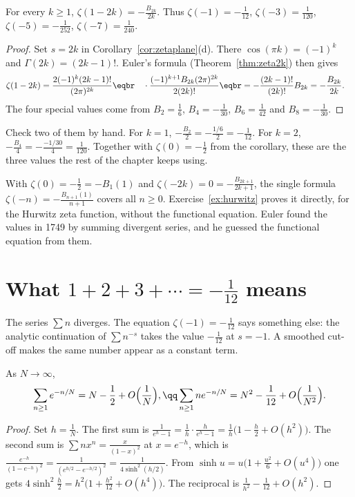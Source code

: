 \begin{theorem}\label{thm:zetaneg}
For every $k\ge1$, $\displaystyle\zeta(1-2k)=-\frac{B_{2k}}{2k}$. Thus $\zeta(-1)=-\frac1{12}$, $\zeta(-3)=\frac1{120}$, $\zeta(-5)=-\frac1{252}$, $\zeta(-7)=\frac1{240}$.
\end{theorem}
\begin{proof}
Set $s=2k$ in Corollary~\ref{cor:zetaplane}(d). There $\cos(\pi k)=(-1)^k$ and $\Gamma(2k)=(2k-1)!$. Euler's formula (Theorem~\ref{thm:zeta2k}) then gives
\[
\begin{aligned}\zeta(1-2k)&=\frac{2(-1)^k(2k-1)!}{(2\pi)^{2k}}\eqbr\quad\cdot\frac{(-1)^{k+1}B_{2k}(2\pi)^{2k}}{2(2k)!}\eqbr=-\frac{(2k-1)!}{(2k)!}B_{2k}=-\frac{B_{2k}}{2k}.\end{aligned}
\]
The four special values come from $B_2=\frac16$, $B_4=-\frac1{30}$, $B_6=\frac1{42}$ and $B_8=-\frac1{30}$.
\end{proof}

Check two of them by hand. For $k=1$, $-\frac{B_2}{2}=-\frac{1/6}{2}=-\frac1{12}$. For $k=2$, $-\frac{B_4}{4}=-\frac{-1/30}{4}=\frac1{120}$. Together with $\zeta(0)=-\frac12$ from the corollary, these are the three values the rest of the chapter keeps using.

With $\zeta(0)=-\frac12=-B_1(1)$ and $\zeta(-2k)=0=-\frac{B_{2k+1}}{2k+1}$, the single formula $\zeta(-n)=-\frac{B_{n+1}(1)}{n+1}$ covers all $n\ge0$. Exercise~\ref{ex:hurwitz} proves it directly, for the Hurwitz zeta function, without the functional equation. Euler found the values in 1749 by summing divergent series, and he guessed the functional equation from them.

\section{What $1+2+3+\cdots=-\frac1{12}$ means}

The series $\sum n$ diverges. The equation $\zeta(-1)=-\frac1{12}$ says something else: the analytic continuation of $\sum n^{-s}$ takes the value $-\frac1{12}$ at $s=-1$. A smoothed cut-off makes the same number appear as a constant term.

\begin{proposition}\label{prop:smoothed}
As $N\to\infty$,
\[
\begin{gathered}\sum_{n\ge1}e^{-n/N}=N-\frac12+O\Bigl(\frac1N\Bigr),\qq\sum_{n\ge1}ne^{-n/N}=N^2-\frac1{12}+O\Bigl(\frac1{N^2}\Bigr).\end{gathered}
\]
\end{proposition}
\begin{proof}
Set $h=\frac1N$. The first sum is $\frac1{e^h-1}=\frac1h\cdot\frac h{e^h-1}=\frac1h\bigl(1-\frac h2+O(h^2)\bigr)$. The second sum is $\sum nx^n=\frac x{(1-x)^2}$ at $x=e^{-h}$, which is
$\frac{e^{-h}}{(1-e^{-h})^2}=\frac1{(e^{h/2}-e^{-h/2})^2}=\frac1{4\sinh^2(h/2)}$. From $\sinh u=u\bigl(1+\frac{u^2}6+O(u^4)\bigr)$ one gets $4\sinh^2\frac h2=h^2\bigl(1+\frac{h^2}{12}+O(h^4)\bigr)$. The reciprocal is
$\frac1{h^2}-\frac1{12}+O(h^2)$.
\end{proof}

